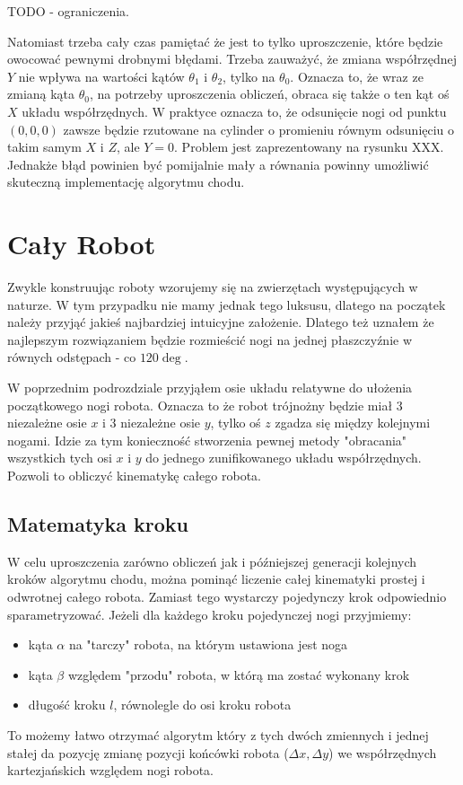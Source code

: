 TODO - ograniczenia.

Natomiast trzeba cały czas pamiętać że jest to tylko uproszczenie, które będzie owocować pewnymi drobnymi błędami. Trzeba zauważyć, że zmiana współrzędnej $Y$ nie wpływa na wartości kątów $\theta_1$ i $\theta_2$, tylko na $\theta_0$. Oznacza to, że wraz ze zmianą kąta $\theta_0$, na potrzeby uproszczenia obliczeń, obraca się także o ten kąt oś $X$ układu współrzędnych. W praktyce oznacza to, że odsunięcie nogi od punktu $(0, 0, 0)$ zawsze będzie rzutowane na cylinder o promieniu równym odsunięciu o takim samym $X$ i $Z$, ale $Y = 0$. Problem jest zaprezentowany na rysunku XXX. Jednakże błąd powinien być pomijalnie mały a równania powinny umożliwić skuteczną implementację algorytmu chodu.

\section{Cały Robot}
Zwykle konstruując roboty wzorujemy się na zwierzętach występujących w naturze. W tym przypadku nie mamy jednak tego luksusu, dlatego na początek należy przyjąć jakieś najbardziej intuicyjne założenie. Dlatego też uznałem że najlepszym rozwiązaniem będzie rozmieścić nogi na jednej płaszczyźnie w równych odstępach - co $120\deg$.

W poprzednim podrozdziale przyjąłem osie układu relatywne do ułożenia początkowego nogi robota. Oznacza to że robot trójnożny będzie miał 3 niezależne osie $x$ i 3 niezależne osie $y$, tylko oś $z$ zgadza się między kolejnymi nogami. Idzie za tym konieczność stworzenia pewnej metody "obracania" wszystkich tych osi $x$ i $y$ do jednego zunifikowanego układu współrzędnych. Pozwoli to obliczyć kinematykę całego robota.

\subsection{Matematyka kroku}
W celu uproszczenia zarówno obliczeń jak i późniejszej generacji kolejnych kroków algorytmu chodu, można pominąć liczenie całej kinematyki prostej i odwrotnej całego robota. Zamiast tego wystarczy pojedynczy krok odpowiednio sparametryzować. Jeżeli dla każdego kroku pojedynczej nogi przyjmiemy:
\begin{itemize}
\item kąta $\alpha$ na "tarczy" robota, na którym ustawiona jest noga
\item kąta $\beta$ względem "przodu" robota, w którą ma zostać wykonany krok
\item długość kroku $l$, równolegle do osi kroku robota
\end{itemize}
To możemy łatwo otrzymać algorytm który z tych dwóch zmiennych i jednej stałej da pozycję zmianę pozycji końcówki robota ($\Delta x, \Delta y$) we współrzędnych kartezjańskich względem nogi robota.

